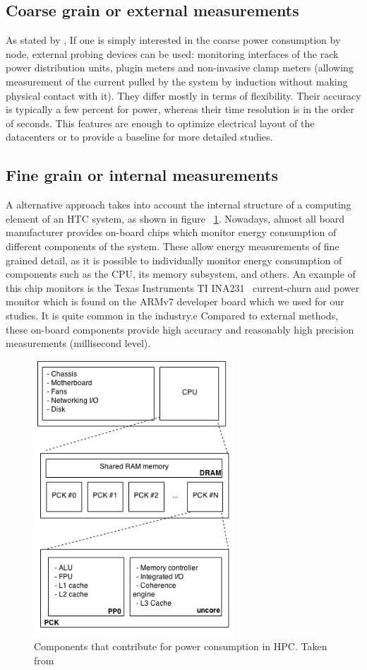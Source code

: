 \subsection*{Coarse grain or external measurements}
As stated by \cite{ACAT}, If one is simply interested in the coarse power consumption by node,
external probing devices can be used: monitoring interfaces
of the rack power distribution units, plugin meters and non-invasive
clamp meters (allowing measurement of the
current pulled by the system by induction without making physical
contact with it). They differ mostly in terms of flexibility.
Their accuracy is typically a few percent for power, whereas their time
resolution is in the order of seconds. This features are enough
to optimize electrical layout of the datacenters or to provide a
baseline for more detailed studies.

\subsection*{Fine grain or internal measurements}
A alternative approach takes into account the internal structure of a
computing element of an HTC system, as shown in figure 
~\ref{fig:power-consumption-model}. Nowadays, almost all board manufacturer
provides on-board chips which monitor energy consumption of
different components of the system. These
allow energy measurements of fine grained detail, as it is possible
to individually monitor energy consumption of components such as
the CPU, its memory subsystem, and others. An example of this chip
monitors is the Texas Instruments TI INA231~\cite{TIINA231} current-churn
and power monitor which is found on the ARMv7 developer board which
we used for our studies. It is quite common in the industry.e
Compared to external methods, these on-board components provide
high accuracy and reasonably high precision measurements (millisecond
level).

\begin{figure}[tbp]
\centering
\includegraphics[width=75mm]{img/energy_model.png}
\caption{Components that contribute for power consumption in HPC. Taken from \cite{ACAT}}
\label{fig:power-consumption-model}
\end{figure}

